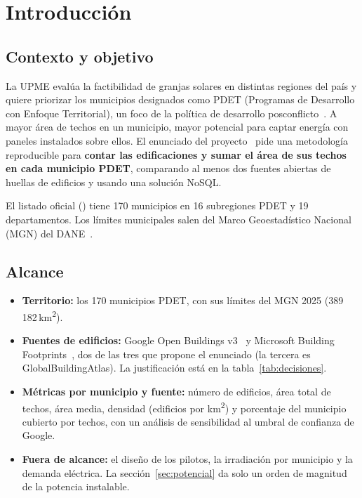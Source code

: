 \section{Introducción}
\label{sec:intro}

\subsection{Contexto y objetivo}

La UPME evalúa la factibilidad de granjas solares en distintas regiones del
país y quiere priorizar los municipios designados como PDET (Programas de
Desarrollo con Enfoque Territorial), un foco de la política de desarrollo
posconflicto~\cite{pdet}. A mayor área de techos en un municipio, mayor
potencial para captar energía con paneles instalados sobre ellos. El
enunciado del proyecto~\cite{enunciado} pide una metodología reproducible
para \textbf{contar las edificaciones y sumar el área de sus techos en cada
municipio PDET}, comparando al menos dos fuentes abiertas de huellas de
edificios y usando una solución NoSQL.

El listado oficial () tiene 170 municipios en 16
subregiones PDET y 19 departamentos. Los límites municipales salen del Marco
Geoestadístico Nacional (MGN) del DANE~\cite{mgn}.

\subsection{Alcance}

\begin{itemize}
  \item \textbf{Territorio:} los 170 municipios PDET, con sus límites del MGN
        2025 (389\,182\,km\textsuperscript{2}).
  \item \textbf{Fuentes de edificios:} Google Open Buildings v3~\cite{google}
        y Microsoft Building Footprints~\cite{microsoft}, dos de las tres que
        propone el enunciado (la tercera es GlobalBuildingAtlas). La
        justificación está en la tabla~\ref{tab:decisiones}.
  \item \textbf{Métricas por municipio y fuente:} número de edificios, área
        total de techos, área media, densidad (edificios por
        km\textsuperscript{2}) y porcentaje del municipio cubierto por techos,
        con un análisis de sensibilidad al umbral de confianza de Google.
  \item \textbf{Fuera de alcance:} el diseño de los pilotos, la irradiación
        por municipio y la demanda eléctrica. La sección~\ref{sec:potencial}
        da solo un orden de magnitud de la potencia instalable.
\end{itemize}

